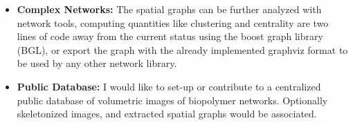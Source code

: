 \begin{itemize}[topsep=0pt]
  \item \textbf{Complex Networks: } The spatial graphs can be further analyzed with network tools, computing quantities like clustering and centrality are two lines of code away from the current status using the boost graph library (BGL), or export the graph with the already implemented graphviz format to be used by any other network library.

  \item \textbf{Public Database: } I would like to set-up or contribute to a centralized public database of volumetric images of biopolymer networks. Optionally skeletonized images, and extracted spatial graphs would be associated.

\end{itemize}



